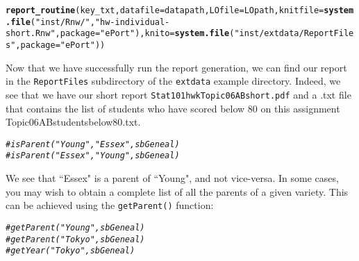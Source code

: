 \documentclass{article}\usepackage[]{graphicx}\usepackage[]{color}
\makeatletter
\newcommand{\hlstr}[1]{\textcolor[rgb]{0.192,0.494,0.8}{#1}}%
\newcommand{\hlcom}[1]{\textcolor[rgb]{0.678,0.584,0.686}{\textit{#1}}}%
\newcommand{\hlstd}[1]{\textcolor[rgb]{0.345,0.345,0.345}{#1}}%
\newcommand{\hlkwc}[1]{\textcolor[rgb]{0.333,0.667,0.333}{#1}}%
\newcommand{\hlkwd}[1]{\textcolor[rgb]{0.737,0.353,0.396}{\textbf{#1}}}%
\newenvironment{kframe}{%
 \def\at@end@of@kframe{}%
 \ifinner\ifhmode%
  \def\at@end@of@kframe{\end{minipage}}%
  \begin{minipage}{\columnwidth}%
 \fi\fi%
 \def\FrameCommand##1{\hskip\@totalleftmargin \hskip-\fboxsep
 \colorbox{shadecolor}{##1}\hskip-\fboxsep
     \hskip-\linewidth \hskip-\@totalleftmargin \hskip\columnwidth}%
 \MakeFramed {\advance\hsize-\width
   \@totalleftmargin\z@ \linewidth\hsize
   \@setminipage}}%
 {\par\unskip\endMakeFramed%
 \at@end@of@kframe}
\newenvironment{knitrout}{}{} %
\numberwithin{equation}{section} %
\makeatother
\begin{document}
\begin{knitrout}
\color{fgcolor}\begin{kframe}
\begin{alltt}
\hlkwd{report_routine}\hlstd{(key_txt,}\hlkwc{datafile}\hlstd{=datapath,}\hlkwc{LOfile}\hlstd{=LOpath,}\hlkwc{knitfile}\hlstd{=}\hlkwd{system.file}\hlstd{(}\hlstr{"inst/Rnw/"}\hlstd{,} \hlstr{"hw-individual-short.Rnw"}\hlstd{,} \hlkwc{package}\hlstd{=}\hlstr{"ePort"}\hlstd{),}\hlkwc{knito}\hlstd{=}\hlkwd{system.file}\hlstd{(}\hlstr{"inst/extdata/ReportFiles"}\hlstd{,} \hlkwc{package}\hlstd{=}\hlstr{"ePort"}\hlstd{))}
\end{alltt}
\end{kframe}
\end{knitrout}

Now that we have successfully run the report generation, we can find our report in the \texttt{ReportFiles} subdirectory of the \texttt{extdata} example directory. Indeed, we see that we have our short report \texttt{Stat101hwkTopic06ABshort.pdf} and a .txt file that contains the list of students who have scored below 80 on this assignment {Topic06ABstudentsbelow80.txt}.




\begin{knitrout}
\color{fgcolor}\begin{kframe}
\begin{alltt}
\hlcom{#isParent("Young","Essex",sbGeneal)}
\hlcom{#isParent("Essex","Young",sbGeneal)}
\end{alltt}
\end{kframe}
\end{knitrout}

We see that ``Essex" is a parent of ``Young", and not vice-versa. In some cases, you may wish to obtain a complete list of all the parents of a given variety. This can be achieved using the \texttt{getParent()} function:

\begin{knitrout}
\color{fgcolor}\begin{kframe}
\begin{alltt}
\hlcom{#getParent("Young",sbGeneal)}
\hlcom{#getParent("Tokyo",sbGeneal)}
\hlcom{#getYear("Tokyo", sbGeneal)}
\end{alltt}
\end{kframe}
\end{knitrout}
\end{document}
